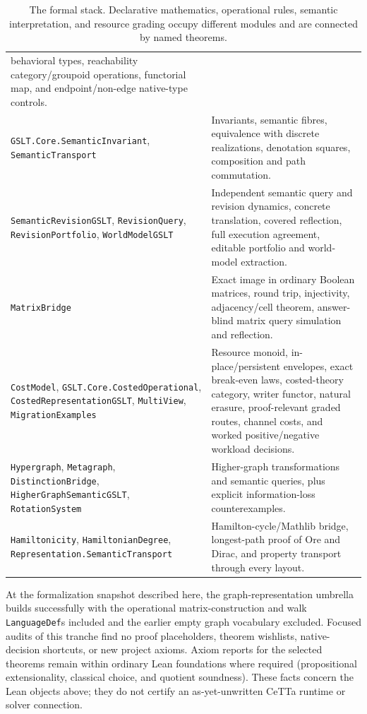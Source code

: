 \documentclass[11pt]{article}
\theoremstyle{remark}
\newcommand{\code}[1]{\texttt{#1}}
\begin{document}
\begin{table}[htbp]
\begin{tabularx}{\textwidth}{@{}p{}X@{}}
behavioral types, reachability category/groupoid operations, functorial map,
and endpoint/non-edge native-type controls.\\
\code{GSLT.Core.SemanticInvariant}, \code{SemanticTransport} & Invariants,
semantic fibres, equivalence with discrete realizations, denotation squares,
composition and path commutation.\\
\code{SemanticRevisionGSLT}, \code{RevisionQuery},
\code{RevisionPortfolio}, \code{WorldModelGSLT} & Independent semantic query
and revision dynamics, concrete translation, covered reflection, full
execution agreement, editable portfolio and world-model extraction.\\
\code{MatrixBridge} & Exact image in ordinary Boolean matrices, round trip,
injectivity, adjacency/cell theorem, answer-blind matrix query simulation and
reflection.\\
\code{CostModel}, \code{GSLT.Core.CostedOperational},
\code{CostedRepresentationGSLT}, \code{MultiView},
\code{MigrationExamples} & Resource monoid,
in-place/persistent envelopes, exact break-even laws, costed-theory category,
writer functor, natural erasure, proof-relevant graded routes, channel costs,
and worked positive/negative workload decisions.\\
\code{Hypergraph}, \code{Metagraph}, \code{DistinctionBridge},
\code{HigherGraphSemanticGSLT}, \code{RotationSystem} & Higher-graph
transformations and semantic queries, plus explicit information-loss
counterexamples.\\
\code{Hamiltonicity}, \code{HamiltonianDegree},
\code{Representation.SemanticTransport} & Hamilton-cycle/Mathlib bridge,
longest-path proof of Ore and Dirac, and property transport through every
layout.\\
\bottomrule
\end{tabularx}
\caption{The formal stack.  Declarative mathematics, operational rules,
semantic interpretation, and resource grading occupy different modules and
are connected by named theorems.}
\label{tab:modules}
\end{table}

At the formalization snapshot described here, the graph-representation umbrella
builds successfully with the operational matrix-construction and walk
\code{LanguageDef}s included and the earlier empty graph vocabulary excluded.
Focused audits of this tranche
find no proof placeholders, theorem wishlists, native-decision shortcuts, or
new project axioms.  Axiom reports for the selected theorems remain within
ordinary Lean foundations where required (propositional extensionality,
classical choice, and quotient soundness).  These facts concern the Lean
objects above; they do not certify an as-yet-unwritten CeTTa runtime or solver
connection.
\end{document}
